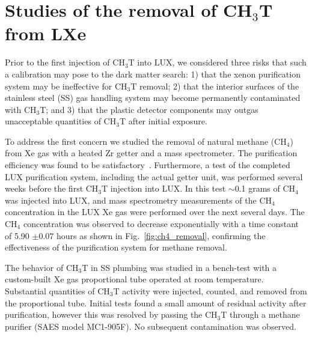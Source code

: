 \section{Studies of the removal of CH$_3$T from LXe }
\label{sec:appendix1}

\newcommand*{\Scale}[2][4]{\scalebox{#1}{$#2$}}%

Prior to the first injection of CH$_3$T into LUX, we considered three risks that such a calibration may pose to the dark matter search: 1) that the xenon purification system may be ineffective for CH$_3$T removal; 2) that the interior surfaces of the stainless steel (SS)  gas handling system may become permanently contaminated with CH$_3$T; and 3) that the plastic detector components may outgas unacceptable quantities of CH$_3$T after initial exposure.

To address the first concern we studied the removal of natural methane (CH$_4$) from Xe gas with a heated Zr getter and a mass spectrometer. The purification efficiency was found to be satisfactory~\cite{Dobi_CH4}. Furthermore, a test of the completed LUX purification system, including the actual getter unit, was performed several weeks before the first CH$_3$T injection into LUX. In this test $\sim$0.1 grams of CH$_4$ was injected into LUX, and mass spectrometry measurements of the CH$_4$ concentration in the LUX Xe gas were performed over the next several days. The CH$_4$ concentration was observed to decrease exponentially with a time constant of 5.90 $\pm 0.07$ hours as shown in Fig.~\ref{fig:ch4_removal}, confirming the effectiveness of the purification system for methane removal.

The behavior of CH$_3$T in SS plumbing was studied in a bench-test with a custom-built Xe gas proportional tube operated at room temperature. Substantial quantities of CH$_3$T activity were injected, counted, and removed from the proportional tube. Initial tests found a small amount of residual activity after purification, however this was resolved by passing the CH$_3$T through a methane purifier (SAES model MC1-905F). No subsequent contamination was observed.

